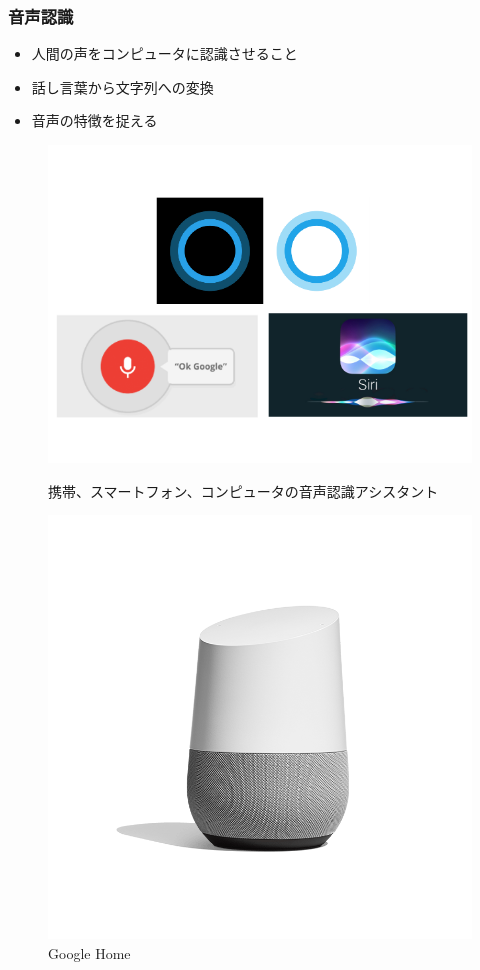 \documentclass[14pt]{beamer}
\begin{document}
\begin{frame}
  \frametitle{音声認識}
  \begin{itemize}
    \item 人間の声をコンピュータに認識させること
    \item 話し言葉から文字列への変換
    \item 音声の特徴を捉える
  \end{itemize}
  \begin{figure}[tbp]
    \begin{minipage}[b]{0.45\columnwidth}
      \centering
      \includegraphics[width=\columnwidth]{voice_assistant.png}
      \caption{\scriptsize 携帯、スマートフォン、コンピュータの音声認識アシスタント}
    \end{minipage}
    \hspace{0.04\columnwidth}
    \begin{minipage}[b]{0.3\columnwidth}
      \centering
      \includegraphics[width=\columnwidth]{google_home.png}
      \caption{\scriptsize Google Home}
    \end{minipage}
  \end{figure}


\end{frame}
\end{document}
